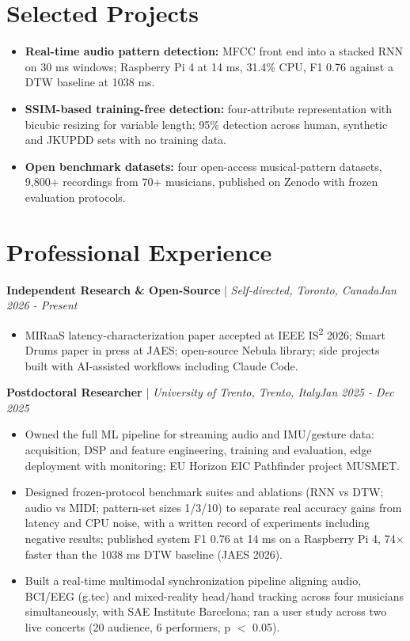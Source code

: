 \documentclass[11pt]{article}
\newenvironment{cvrole}[5]{%
  \par\noindent\textbf{\large #1} | \textit{\small #2, #3}\hfill \textit{\small #4 - #5}\par
  \begin{itemize}[leftmargin=2em, itemsep=-0.3em, topsep=-0.5em]%
}{%
  \end{itemize}\par\noindent\mbox{}\par\vspace{0.1em}%
}
\begin{document}
\section*{Selected Projects \footnotesize {}}
\begin{itemize}[leftmargin=1.2em, itemsep=-0.25em]
    \item \textbf{Real-time audio pattern detection:} MFCC front end into a stacked RNN on 30 ms windows; Raspberry Pi 4 at 14 ms, 31.4\% CPU, F1 0.76 against a DTW baseline at 1038 ms.
    \item \textbf{SSIM-based training-free detection:} four-attribute representation with bicubic resizing for variable length; 95\% detection across human, synthetic and JKUPDD sets with no training data.
    \item \textbf{Open benchmark datasets:} four open-access musical-pattern datasets, 9,800+ recordings from 70+ musicians, published on Zenodo with frozen evaluation protocols.
\end{itemize}

\section*{Professional Experience}

\begin{cvrole}{Independent Research \& Open-Source}{Self-directed}{Toronto, Canada}{Jan 2026}{Present}
    \item MIRaaS latency-characterization paper accepted at IEEE IS\textsuperscript{2} 2026; Smart Drums paper in press at JAES; open-source Nebula library; side projects built with AI-assisted workflows including Claude Code.
\end{cvrole}

\begin{cvrole}{Postdoctoral Researcher}{University of Trento}{Trento, Italy}{Jan 2025}{Dec 2025}
    \item Owned the full ML pipeline for streaming audio and IMU/gesture data: acquisition, DSP and feature engineering, training and evaluation, edge deployment with monitoring; EU Horizon EIC Pathfinder project MUSMET.
    \item Designed frozen-protocol benchmark suites and ablations (RNN vs DTW; audio vs MIDI; pattern-set sizes 1/3/10) to separate real accuracy gains from latency and CPU noise, with a written record of experiments including negative results; published system F1 0.76 at 14 ms on a Raspberry Pi 4, 74$\times$ faster than the 1038 ms DTW baseline (JAES 2026).
    \item Built a real-time multimodal synchronization pipeline aligning audio, BCI/EEG (g.tec) and mixed-reality head/hand tracking across four musicians simultaneously, with SAE Institute Barcelona; ran a user study across two live concerts (20 audience, 6 performers, p $<$ 0.05).
\end{cvrole}
\end{document}
